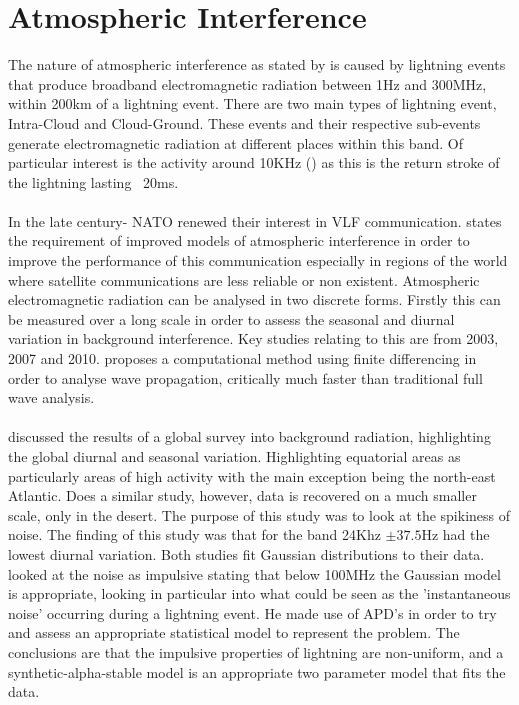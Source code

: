 \section{Atmospheric Interference}
The nature of atmospheric interference as stated by \cite{Rakov2013} is caused by lightning events that produce broadband electromagnetic radiation between 1Hz and 300MHz, within 200km of a lightning event. There are two main types of lightning event, Intra-Cloud and Cloud-Ground. These events and their respective sub-events generate electromagnetic radiation at different places within this band. Of particular interest is the activity around 10KHz (\cite{Fullekrug2013}) as this is the return stroke of the lightning lasting ~20ms.
\\\\
 In the late  century- NATO renewed their interest in VLF communication. \cite{Posterijen1964} states the requirement of improved models of atmospheric interference in order to improve the performance of this communication especially in regions of the world where satellite communications are less reliable or non existent.
 Atmospheric electromagnetic radiation can be analysed in two discrete forms. Firstly this can be measured over a long scale in order to assess the seasonal and diurnal variation in background interference. Key studies relating to this are from 2003, 2007 and 2010. \cite{berenger2002} proposes a computational method using finite differencing in order to analyse wave propagation, critically much faster than traditional full wave analysis.
 \\\\
 \cite{Fieve2007} discussed the results of a global survey into background radiation, highlighting the global diurnal and seasonal variation. Highlighting equatorial areas as particularly areas of high activity with the main exception being the north-east Atlantic. \cite{Reuveni2010} Does a similar study, however, data is recovered on a much smaller scale, only in the desert. The purpose of this study was to look at the spikiness of noise. The finding of this study was that for the band 24Khz $\pm37.5\si{\hertz}$ had the lowest diurnal variation. Both studies fit Gaussian distributions to their data. \cite{Chrissan2000} looked at the noise as impulsive stating that below 100MHz the Gaussian model is appropriate, looking in particular into what could be seen as the 'instantaneous noise' occurring during a lightning event. He made use of APD's in order to try and assess an appropriate statistical model to represent the problem. The conclusions are that the impulsive properties of lightning are non-uniform, and a synthetic-alpha-stable model is an appropriate two parameter model that fits the data.

